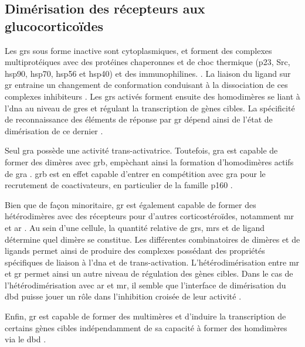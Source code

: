 \documentclass[../main.tex]{subfiles}
\begin{document}
\subsection{Dimérisation des récepteurs aux glucocorticoïdes}\label{subsubsec:gr-dimerisation}
Les \glspl{gr} sous forme inactive sont cytoplasmiques, et forment des complexes multiprotéiques avec des protéines chaperonnes et de choc thermique (p23, Src, \gls{hsp90}, \gls{hsp70}, \gls{hsp56} et \gls{hsp40}) et des immunophilines. \citep{Baulieu1987,Pratt2006}.
La liaison du ligand sur \gls{gr} entraine un changement de conformation conduisant à la dissociation de ces complexes inhibiteurs \citep{Groyer1987}.
Les \glspl{gr} activés forment ensuite des homodimères \citep{Wrange1989} se liant à l'\gls{dna} au niveau de \glspl{gre} et régulant la transcription de gènes cibles.
La spécificité de reconnaissance des éléments de réponse par \gls{gr} dépend ainsi de l'état de dimérisation de ce dernier \citep{Eriksson1990}.
\par
Seul \gls{gra} possède une activité trans-activatrice.
Toutefois, \gls{gra} est capable de former des dimères avec \gls{grb}, empèchant ainsi la formation d'homodimères actifs de \gls{gra} \citep{Oakley1999}.
\gls{grb} est en effet capable d'entrer en compétition avec \gls{gra} pour le recrutement de coactivateurs, en particulier de la famille p160 \citep{Yudt2003,Charmandari2005}.
\par
Bien que de façon minoritaire, \gls{gr} est également capable de former des hétérodimères avec des récepteurs pour d'autres corticostéroïdes, notamment \gls{mr} \citep{Trapp1994,Savory2001} et \gls{ar} \citep{Chen1997}.
Au sein d'une cellule, la quantité relative de \glspl{gr}, \glspl{mr} et de ligand détermine quel dimère se constitue.
Les différentes combinatoires de dimères et de ligands permet ainsi de produire des complexes possédant des propriétés spécifiques de liaison à l'\gls{dna} et de trans-activation.
L'hétérodimérisation entre \gls{mr} et \gls{gr} permet ainsi un autre niveau de régulation des gènes cibles.
Dans le cas de l'hétérodimérisation avec \gls{ar} et \gls{mr}, il semble que l'interface de dimérisation du \gls{dbd} puisse jouer un rôle dans l'inhibition croisée de leur activité \citep{Chen1997,Liu1997}.
\par
Enfin, \gls{gr} est capable de former des multimères et d'induire la transcription de certains gènes cibles indépendamment de sa capacité à former des homdimères via le \gls{dbd} \citep{Adams2003}.

\end{document}
